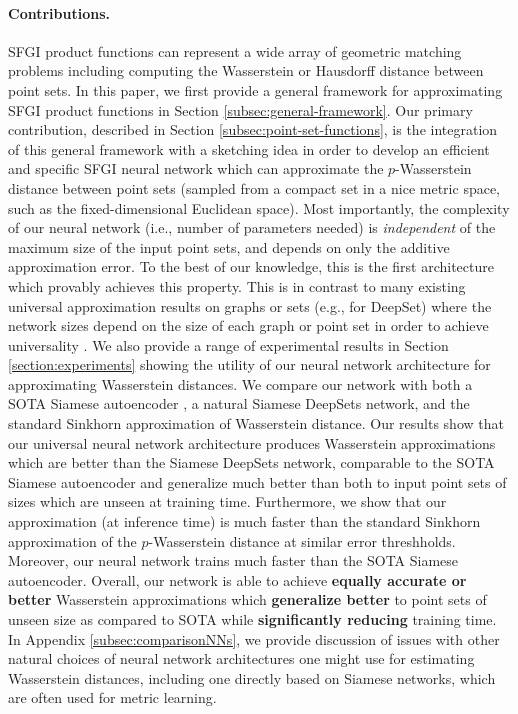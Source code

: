 \documentclass[12pt]{article}
\newcommand{\yusu}[1]		{{ \textcolor{darkgreen} {{\sc [Yusu]:} #1}}}
\newcommand{\SFGI} {{SFGI}}
\begin{document}
\paragraph{Contributions.}\SFGI{} product functions can represent a wide array of geometric matching problems including computing the Wasserstein or Hausdorff distance between point sets.
In this paper, we first provide a general framework for approximating \SFGI{} product functions in Section \ref{subsec:general-framework}. 
Our primary contribution, described in Section \ref{subsec:point-set-functions}, is the integration of this general framework with a sketching idea in order to develop an efficient and specific \SFGI{} neural network which can approximate the $p$-Wasserstein distance between point sets (sampled from a compact set in a nice  metric space, such as the fixed-dimensional Euclidean space).
Most importantly, the complexity of our neural network (i.e., number of parameters needed) is \emph{independent} of the maximum size of the input point sets, and depends on only the additive approximation error. 
To the best of our knowledge, this is the first architecture which provably achieves this property.
This is in contrast to many existing universal approximation results on graphs or sets (e.g., for DeepSet) where the network sizes depend on the size of each graph or point set in order to achieve universality \citep{maron2019universality, wagstaff2022universal, bueno2021representation}. 
We also provide a range of experimental results in Section \ref{section:experiments} showing the utility of our neural network architecture for approximating Wasserstein distances. 
We compare our network with both a SOTA Siamese autoencoder \citep{kawano2020learning}, a natural Siamese DeepSets network, and the standard Sinkhorn approximation of Wasserstein distance. 
Our results show that our universal neural network architecture produces Wasserstein approximations which are better than the Siamese DeepSets network, comparable to the SOTA Siamese autoencoder and generalize much better than both to input point sets of sizes which are unseen at training time. Furthermore, we show that our approximation (at inference time) is much faster than the standard Sinkhorn approximation of the $p$-Wasserstein distance at similar error threshholds.
Moreover, our neural network trains much faster than the SOTA Siamese autoencoder. 
Overall, our network is able to achieve \textbf{equally accurate or better} Wasserstein approximations which \textbf{generalize better} to point sets of unseen size as compared to SOTA while \textbf{significantly reducing} training time. 
In Appendix \ref{subsec:comparisonNNs}, we provide discussion of issues with other natural choices of neural network architectures one might use for estimating Wasserstein distances, including one directly based on Siamese networks, which are often used for metric learning. 
\end{document}
